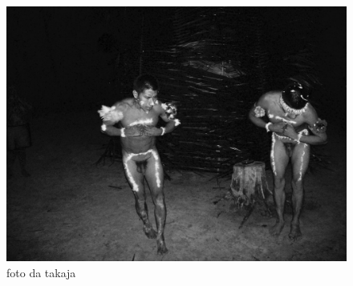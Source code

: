 \begin{figure}[H]
\centering
  \includegraphics[width=\textwidth]{./imgs/100_1695}
\caption{foto da takaja}
\end{figure}

